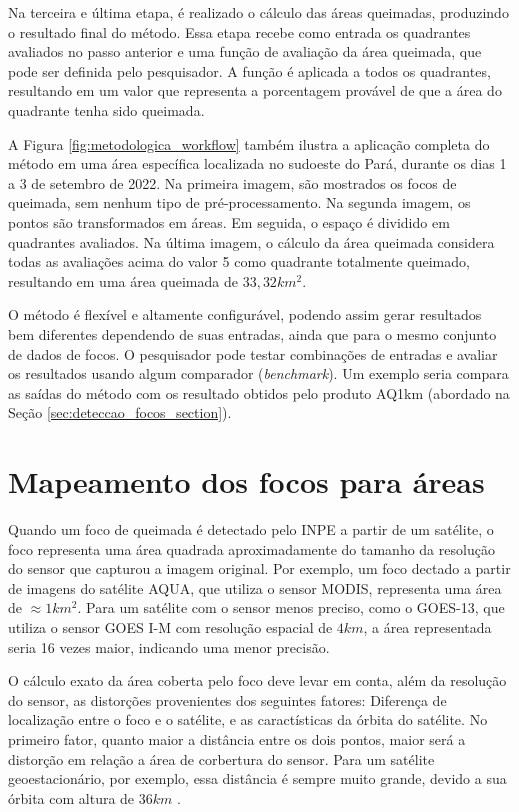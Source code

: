 \documentclass[cic,tc]{iiufrgs}
\begin{document}
Na terceira e última etapa, é realizado o cálculo das áreas queimadas, produzindo o resultado final do método. Essa etapa recebe como entrada os quadrantes avaliados no passo anterior e uma função de avaliação da área queimada, que pode ser definida pelo pesquisador. A função é aplicada a todos os quadrantes, resultando em um valor que representa a porcentagem provável de que a área do quadrante tenha sido queimada.

A Figura \ref{fig:metodologica_workflow} também ilustra a aplicação completa do método em uma área específica localizada no sudoeste do Pará, durante os dias 1 a 3 de setembro de 2022. Na primeira imagem, são mostrados os focos de queimada, sem nenhum tipo de pré-processamento. Na segunda imagem, os pontos são transformados em áreas. Em seguida, o espaço é dividido em quadrantes avaliados. Na última imagem, o cálculo da área queimada considera todas as avaliações acima do valor 5 como quadrante totalmente queimado, resultando em uma área queimada de $33,32 km^2$.

O método é flexível e altamente configurável, podendo assim gerar resultados bem diferentes dependendo de suas entradas, ainda que para o mesmo conjunto de dados de focos. O pesquisador pode testar combinações de entradas e avaliar os resultados usando algum comparador (\textit{benchmark}). Um exemplo seria compara as saídas do método com os resultado obtidos pelo produto AQ1km (abordado na Seção \ref{sec:deteccao_focos_section}).

\section{Mapeamento dos focos para áreas}
\label{sec:focos_para_areas}

Quando um foco de queimada é detectado pelo INPE a partir de um satélite, o foco representa uma área quadrada aproximadamente do tamanho da resolução do sensor que capturou a imagem original. Por exemplo, um foco dectado a partir de imagens do satélite AQUA, que utiliza o sensor MODIS, representa uma área de $\approx1 km^2$. Para um satélite com o sensor menos preciso, como o GOES-13, que utiliza o sensor GOES I-M com resolução espacial de $4 km$, a área representada seria 16 vezes maior, indicando uma menor precisão.

O cálculo exato da área coberta pelo foco deve levar em conta, além da resolução do sensor, as distorções provenientes dos seguintes fatores: Diferença de localização entre o foco e o satélite, e as caractísticas da órbita do satélite. No primeiro fator, quanto maior a distância entre os dois pontos, maior será a distorção em relação a área de corbertura do sensor. Para um satélite geoestacionário, por exemplo, essa distância é sempre muito grande, devido a sua órbita com altura de $36 km$ \citep{EmbrapaSatelites}.
\end{document}
